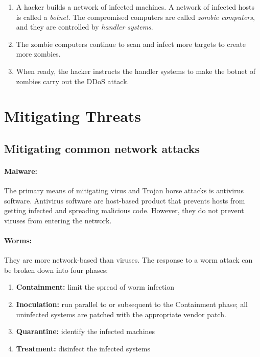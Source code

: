\begin{enumerate}
\item A hacker builds a network of infected machines. A network of infected hosts is called a \emph{botnet}. The compromised computers are called \emph{zombie computers}, and they are controlled by \emph{handler systems}.
\item The zombie computers continue to scan and infect more targets to create more zombies.
\item When ready, the hacker instructs the handler systems to make the botnet of zombies carry out the DDoS attack.
\end{enumerate}

\section{Mitigating Threats}

\subsection{Mitigating common network attacks}

\paragraph{Malware:} The primary means of mitigating virus and Trojan horse attacks is antivirus software. Antivirus software are host-based product that prevents hosts from getting infected and spreading malicious code. However, they do not prevent viruses from entering the network.

\paragraph{Worms:} They are more network-based than viruses. The response to a worm attack can be broken down into four phases:

\begin{enumerate}
\item \textbf{\textbf{Containment}:} limit the spread of worm infection
\item \textbf{Inoculation:} run parallel to or subsequent to the Containment phase; all uninfected systems are patched with the appropriate vendor patch.
\item \textbf{Quarantine:} identify the infected machines
\item \textbf{Treatment:} disinfect the infected systems
\end{enumerate}

